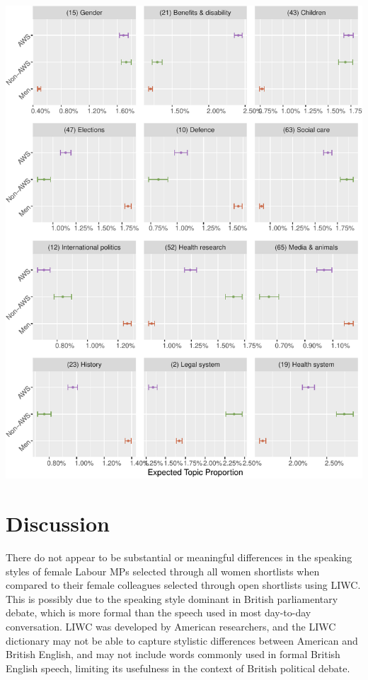 \documentclass[]{article}
\let\origfigure\figure
\let\endorigfigure\endfigure
\renewenvironment{figure}[1][2] {
    \expandafter\origfigure\expandafter[H]
} {
    \endorigfigure
}
\theoremstyle{definition}
\theoremstyle{definition}
\theoremstyle{definition}
\theoremstyle{remark}
\begin{document}
\begin{figure}
\centering
\includegraphics{methodology_files/figure-latex/p-effect-cv-1.pdf}
\caption{\label{fig:p-effect-cv}Topics with the greatest frequency
coefficient of variation}
\end{figure}

\hypertarget{discussion}{%
\section{Discussion}\label{discussion}}

There do not appear to be substantial or meaningful differences in the
speaking styles of female Labour MPs selected through all women
shortlists when compared to their female colleagues selected through
open shortlists using LIWC. This is possibly due to the speaking style
dominant in British parliamentary debate, which is more formal than the
speech used in most day-to-day conversation. LIWC was developed by
American researchers, and the LIWC dictionary may not be able to capture
stylistic differences between American and British English, and may not
include words commonly used in formal British English speech, limiting
its usefulness in the context of British political debate.
\end{document}

